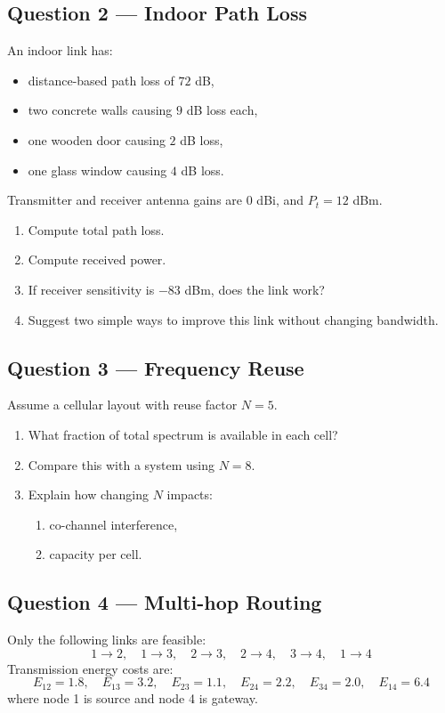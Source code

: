 \documentclass[11pt,a4paper]{article}
\begin{document}
\subsection*{Question 2 --- Indoor Path Loss}
An indoor link has:
\begin{itemize}[leftmargin=1.2cm]
    \item distance-based path loss of $72$ dB,
    \item two concrete walls causing $9$ dB loss each,
    \item one wooden door causing $2$ dB loss,
    \item one glass window causing $4$ dB loss.
    \end{itemize}

Transmitter and receiver antenna gains are $0$ dBi, and $P_t = 12$ dBm.

\begin{enumerate}[label=\alph*)]
    \item Compute total path loss.
    \item Compute received power.
    \item If receiver sensitivity is $-83$ dBm, does the link work?
    \item Suggest two simple ways to improve this link without changing bandwidth.
\end{enumerate}

\subsection*{Question 3 --- Frequency Reuse}
Assume a cellular layout with reuse factor $N=5$.

\begin{enumerate}[label=\alph*)]
    \item What fraction of total spectrum is available in each cell?
    \item Compare this with a system using $N=8$.
    \item Explain how changing $N$ impacts:
    \begin{enumerate}[label=\roman*)]
        \item co-channel interference,
        \item capacity per cell.
    \end{enumerate}
\end{enumerate}

\subsection*{Question 4 --- Multi-hop Routing}
Only the following links are feasible:
\[
1 \rightarrow 2,\quad 1 \rightarrow 3,\quad 2 \rightarrow 3,\quad 2 \rightarrow 4,\quad 3 \rightarrow 4,\quad 1 \rightarrow 4
\]
Transmission energy costs are:
\[
E_{12}=1.8,\quad E_{13}=3.2,\quad E_{23}=1.1,\quad E_{24}=2.2,\quad E_{34}=2.0,\quad E_{14}=6.4
\]
where node 1 is source and node 4 is gateway.
\end{document}
